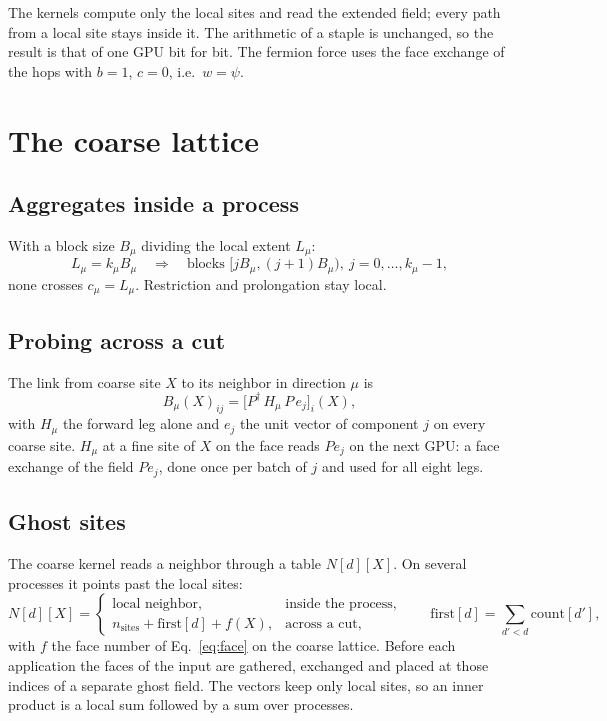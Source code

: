\documentclass[11pt,a4paper]{article}
\numberwithin{equation}{section}
\newcommand{\dg}{^{\dagger}}
\begin{document}
The kernels compute only the local sites and read the extended field; every path from a local site
stays inside it. The arithmetic of a staple is unchanged, so the result is that of one GPU bit for
bit. The fermion force uses the face exchange of the hops with $b=1$, $c=0$, i.e.\ $w=\psi$.

\section{The coarse lattice}

\subsection{Aggregates inside a process}

With a block size $B_\mu$ dividing the local extent $L_\mu$:
\begin{equation}
L_\mu = k_\mu B_\mu \quad\Rightarrow\quad \text{blocks } \big[jB_\mu,(j+1)B_\mu\big),\ j=0,\dots,k_\mu-1,
\end{equation}
none crosses $c_\mu=L_\mu$. Restriction and prolongation stay local.

\subsection{Probing across a cut}

The link from coarse site $X$ to its neighbor in direction $\mu$ is
\begin{equation}
B_\mu(X)_{ij} = \big[P\dg\,H_\mu\,P\,e_j\big]_i(X),
\end{equation}
with $H_\mu$ the forward leg alone and $e_j$ the unit vector of component $j$ on every coarse site.
$H_\mu$ at a fine site of $X$ on the face reads $Pe_j$ on the next GPU: a face exchange of the field
$Pe_j$, done once per batch of $j$ and used for all eight legs.

\subsection{Ghost sites}

The coarse kernel reads a neighbor through a table $N[d][X]$. On several processes it points past
the local sites:
\begin{equation}
N[d][X] = \begin{cases}
\text{local neighbor}, & \text{inside the process},\\
n_{\text{sites}} + \text{first}[d] + f(X), & \text{across a cut},
\end{cases}
\qquad \text{first}[d]=\sum_{d'<d}\text{count}[d'],
\end{equation}
with $f$ the face number of Eq.~\eqref{eq:face} on the coarse lattice. Before each application the
faces of the input are gathered, exchanged and placed at those indices of a separate ghost field.
The vectors keep only local sites, so an inner product is a local sum followed by a sum over
processes.
\end{document}
